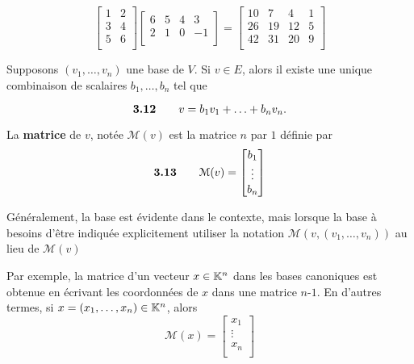 \documentclass[12pt]{book}
\begin{document}
\begin{equation*}
    \begin{bmatrix}
    1 & 2 \\
    3 & 4 \\
    5 & 6 \\
    \end{bmatrix}
    \begin{bmatrix}
    6 & 5 & 4 & 3 \\
    2 & 1 & 0 & -1\\
    \end{bmatrix}
    =
    \begin{bmatrix}
    10 & 7  & 4  & 1 \\
    26 & 19 & 12 & 5 \\
    42 & 31 & 20 & 9 \\
    \end{bmatrix}
\end{equation*}

Supposons $(v_1,\ldots,v_n)$ une base de $V$. Si $v\in E$, alors il existe une unique combinaison de scalaires $b_1,\ldots,b_n$ tel que

\begin{equation*}
    \textrm{\textbf{3.12}} \qquad v=b_1v_1 + \ldots + b_nv_n.
\end{equation*}

La \textbf{matrice} de $v$, notée $\mathcal{M}(v)$ est la matrice $n$ par $1$ définie par \begin{equation*}
    \textrm{\textbf{3.13}} \qquad
    \mathcal{M}(v)
    = 
    \begin{bmatrix}
    b_1 \\
    \vdots \\ 
    b_n \\
    \end{bmatrix}
\end{equation*}

Généralement, la base est évidente dans le contexte, mais lorsque la base à besoins d'être indiquée explicitement utiliser la notation $\mathcal{M}(v, (v_1,\ldots,v_n))$ au lieu de $\mathcal{M}(v)$

Par exemple, la matrice d'un vecteur $x\in\mathbb{K}^n$ dans les bases canoniques est obtenue en écrivant les coordonnées de $x$ dans une matrice $n$-$1$. En d'autres termes, si $x=(x_1,\ldots,x_n)\in\mathbb{K}^n$, alors 
\begin{equation*}
    \mathcal{M}(x)
    = 
    \begin{bmatrix}
    x_1 \\
    \vdots \\ 
    x_n \\
    \end{bmatrix}
\end{equation*}
\end{document}
